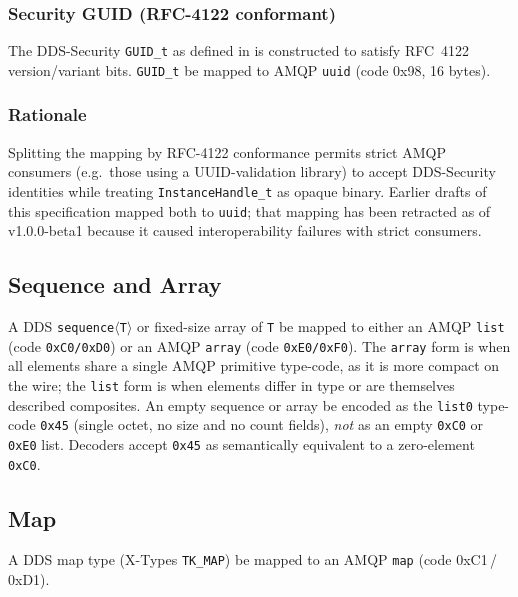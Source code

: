 \documentclass{../styles/zerodds-vendor-spec}
\begin{document}
\subsubsection{Security GUID (RFC-4122 conformant)}

The DDS-Security \texttt{GUID\_t} as defined in
 is constructed to satisfy
RFC~4122 version/variant bits. \texttt{GUID\_t}  be
mapped to AMQP \texttt{uuid} (code \textsf{0x98}, 16 bytes).

\subsubsection{Rationale}

Splitting the mapping by RFC-4122 conformance permits strict AMQP
consumers (e.g.\ those using a UUID-validation library) to accept
DDS-Security identities while treating
\texttt{InstanceHandle\_t} as opaque binary. Earlier drafts of
this specification mapped both to \texttt{uuid}; that mapping has
been retracted as of v1.0.0-beta1 because it caused interoperability
failures with strict consumers.

\subsection{Sequence and Array}

A DDS \texttt{sequence$\langle$T$\rangle$} or fixed-size array of
\texttt{T}  be mapped to either an AMQP \texttt{list}
(code \texttt{0xC0/0xD0}) or an AMQP \texttt{array} (code
\texttt{0xE0/0xF0}). The \texttt{array} form is 
when all elements share a single AMQP primitive type-code, as it
is more compact on the wire; the \texttt{list} form is
 when elements differ in type or are themselves
described composites. An empty sequence or array 
be encoded as the \texttt{list0} type-code \texttt{0x45} (single
octet, no size and no count fields), \emph{not} as an empty
\texttt{0xC0} or \texttt{0xE0} list. Decoders 
accept \texttt{0x45} as semantically equivalent to a zero-element
\texttt{0xC0}.

\subsection{Map}

A DDS map type (X-Types \texttt{TK\_MAP})  be mapped
to an AMQP \texttt{map} (code \textsf{0xC1}\,/\,\textsf{0xD1}).
\end{document}
